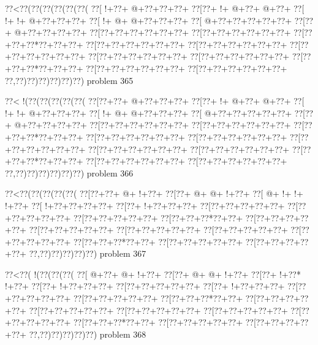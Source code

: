 \vbox{\vbox{\goo
\0??<\0??(\0??(\0??(\0??(\0??(\0??(
\0??[\- !+\0??+\- @+\0??+\0??+\0??+
\0??[\0??+\- !+\- @+\0??+\- @+\0??+
\0??[\- !+\- !+\- @+\0??+\0??+\0??+
\0??[\- !+\- @+\- @+\0??+\0??+\0??+
\0??[\- @+\0??+\0??+\0??+\0??+\0??+
\0??[\0??+\- @+\0??+\0??+\0??+\0??+
\0??[\0??+\0??+\0??+\0??+\0??+\0??+
\0??[\0??+\0??+\0??+\0??+\0??+\0??+
\0??[\0??+\0??+\0??*\0??+\0??+\0??+
\0??[\0??+\0??+\0??+\0??+\0??+\0??+
\0??[\0??+\0??+\0??+\0??+\0??+\0??+
\0??[\0??+\0??+\0??+\0??+\0??+\0??+
\0??[\0??+\0??+\0??+\0??+\0??+\0??+
\0??[\0??+\0??+\0??+\0??+\0??+\0??+
\0??[\0??+\0??+\0??*\0??+\0??+\0??+
\0??[\0??+\0??+\0??+\0??+\0??+\0??+
\0??[\0??+\0??+\0??+\0??+\0??+\0??+
\0??,\0??)\0??)\0??)\0??)\0??)\0??)
}
\hfil problem 365\hfil\break
}

\vbox{\vbox{\goo
\0??<\- !(\0??(\0??(\0??(\0??(\0??(
\0??[\0??+\0??+\- @+\0??+\0??+\0??+
\0??[\0??+\- !+\- @+\0??+\- @+\0??+
\0??[\- !+\- !+\- @+\0??+\0??+\0??+
\0??[\- !+\- @+\- @+\0??+\0??+\0??+
\0??[\- @+\0??+\0??+\0??+\0??+\0??+
\0??[\0??+\- @+\0??+\0??+\0??+\0??+
\0??[\0??+\0??+\0??+\0??+\0??+\0??+
\0??[\0??+\0??+\0??+\0??+\0??+\0??+
\0??[\0??+\0??+\0??*\0??+\0??+\0??+
\0??[\0??+\0??+\0??+\0??+\0??+\0??+
\0??[\0??+\0??+\0??+\0??+\0??+\0??+
\0??[\0??+\0??+\0??+\0??+\0??+\0??+
\0??[\0??+\0??+\0??+\0??+\0??+\0??+
\0??[\0??+\0??+\0??+\0??+\0??+\0??+
\0??[\0??+\0??+\0??*\0??+\0??+\0??+
\0??[\0??+\0??+\0??+\0??+\0??+\0??+
\0??[\0??+\0??+\0??+\0??+\0??+\0??+
\0??,\0??)\0??)\0??)\0??)\0??)\0??)
}
\hfil problem 366\hfil\break
}

\vbox{\vbox{\goo
\0??<\0??(\0??(\0??(\0??(\0??(
\0??[\0??+\0??+\- @+\- !+\0??+
\0??[\0??+\- @+\- @+\- !+\0??+
\0??[\- @+\- !+\- !+\- !+\0??+
\0??[\- !+\0??+\0??+\0??+\0??+
\0??[\0??+\- !+\0??+\0??+\0??+
\0??[\0??+\0??+\0??+\0??+\0??+
\0??[\0??+\0??+\0??+\0??+\0??+
\0??[\0??+\0??+\0??+\0??+\0??+
\0??[\0??+\0??+\0??*\0??+\0??+
\0??[\0??+\0??+\0??+\0??+\0??+
\0??[\0??+\0??+\0??+\0??+\0??+
\0??[\0??+\0??+\0??+\0??+\0??+
\0??[\0??+\0??+\0??+\0??+\0??+
\0??[\0??+\0??+\0??+\0??+\0??+
\0??[\0??+\0??+\0??*\0??+\0??+
\0??[\0??+\0??+\0??+\0??+\0??+
\0??[\0??+\0??+\0??+\0??+\0??+
\0??,\0??)\0??)\0??)\0??)\0??)
}
\hfil problem 367\hfil\break
}

\vbox{\vbox{\goo
\0??<\0??(\- !(\0??(\0??(\0??(
\0??[\- @+\0??+\- @+\- !+\0??+
\0??[\0??+\- @+\- @+\- !+\0??+
\0??[\0??+\- !+\0??*\- !+\0??+
\0??[\0??+\- !+\0??+\0??+\0??+
\0??[\0??+\0??+\0??+\0??+\0??+
\0??[\0??+\- !+\0??+\0??+\0??+
\0??[\0??+\0??+\0??+\0??+\0??+
\0??[\0??+\0??+\0??+\0??+\0??+
\0??[\0??+\0??+\0??*\0??+\0??+
\0??[\0??+\0??+\0??+\0??+\0??+
\0??[\0??+\0??+\0??+\0??+\0??+
\0??[\0??+\0??+\0??+\0??+\0??+
\0??[\0??+\0??+\0??+\0??+\0??+
\0??[\0??+\0??+\0??+\0??+\0??+
\0??[\0??+\0??+\0??*\0??+\0??+
\0??[\0??+\0??+\0??+\0??+\0??+
\0??[\0??+\0??+\0??+\0??+\0??+
\0??,\0??)\0??)\0??)\0??)\0??)
}
\hfil problem 368\hfil\break
}

